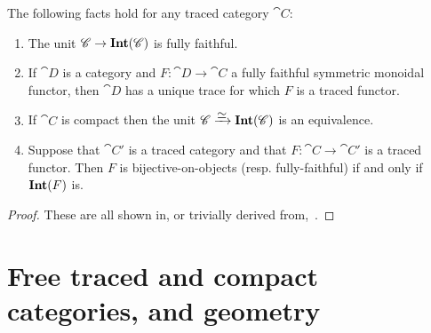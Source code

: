 \documentclass[11pt,oneside,article]{memoir}
\begin{document}
\begin{lemma}\label{lemma:fully_faithful_and_trace}
The following facts hold for any traced category $\cat{C}$:
\begin{enumerate}[label={\upshape\roman*}.]
   \item The unit $\mathscr{C}\to\mathbf{Int}(\mathscr{C})$ is fully faithful.
   \item If $\cat{D}$ is a category and $F\colon\cat{D}\to\cat{C}$ a fully faithful symmetric
      monoidal functor, then $\cat{D}$ has a unique trace for which $F$ is a traced functor.
   \item If $\cat{C}$ is compact then the unit $\cat{C}\To{\raisebox{-1ex}{$\equiv$}}\Int(\cat{C})$ is an equivalence.
   \item Suppose that $\cat{C'}$ is a traced category and that $F\colon \cat{C}\to \cat{C}'$ is a
      traced functor. Then $F$ is bijective-on-objects (resp. fully-faithful) if and only if
      $\mathbf{Int}(F)$ is.
\end{enumerate}
\end{lemma}
\begin{proof}
   These are all shown in, or trivially derived from,~\cite{JoyalStreetVerity}.
\end{proof}

\section{Free traced and compact categories, and geometry}\label{sec:free_and_geometry}
\end{document}
